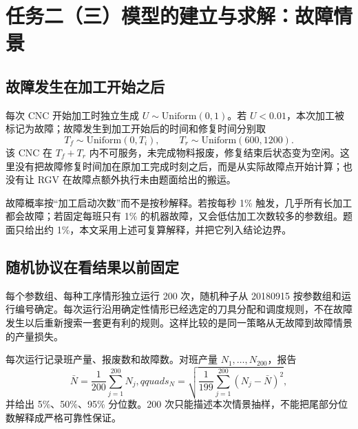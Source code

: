 \documentclass[UTF8,11pt,a4paper]{ctexart}
\begin{document}
\label{mcm-q3-end}

\section{任务二（三）模型的建立与求解：故障情景}
\label{mcm-q4-start}

\subsection{故障发生在加工开始之后}

每次 CNC 开始加工时独立生成 $U\sim\mathrm{Uniform}(0,1)$。若 $U<0.01$，本次加工被标记为故障；故障发生到加工开始后的时间和修复时间分别取
\begin{equation}
T_f\sim\mathrm{Uniform}(0,T_i),\qquad
T_r\sim\mathrm{Uniform}(600,1200).
\label{eq:failure-model-b}
\end{equation}
该 CNC 在 $T_f+T_r$ 内不可服务，未完成物料报废，修复结束后状态变为空闲。这里没有把故障修复时间加在原加工完成时刻之后，而是从实际故障点开始计算；也没有让 RGV 在故障点额外执行未由题面给出的搬运。

故障概率按“加工启动次数”而不是按秒解释。若按每秒 1\% 触发，几乎所有长加工都会故障；若固定每班只有 1\% 的机器故障，又会低估加工次数较多的参数组。题面只给出约 1\%，本文采用上述可复算解释，并把它列入结论边界。

\subsection{随机协议在看结果以前固定}

每个参数组、每种工序情形独立运行 200 次，随机种子从 20180915 按参数组和运行编号确定。每次运行沿用确定性情形已经选定的刀具分配和调度规则，不在故障发生以后重新搜索一套更有利的规则。这样比较的是同一策略从无故障到故障情景的产量损失。

每次运行记录班产量、报废数和故障数。对班产量 $N_1,\ldots,N_{200}$，报告
\begin{equation}
\bar N=\frac1{200}\sum_{j=1}^{200}N_j,qquad
s_N=\sqrt{\frac1{199}\sum_{j=1}^{200}(N_j-\bar N)^2},
\label{eq:mc-summary-b}
\end{equation}
并给出 5\%、50\%、95\% 分位数。200 次只能描述本次情景抽样，不能把尾部分位数解释成严格可靠性保证。
\end{document}
